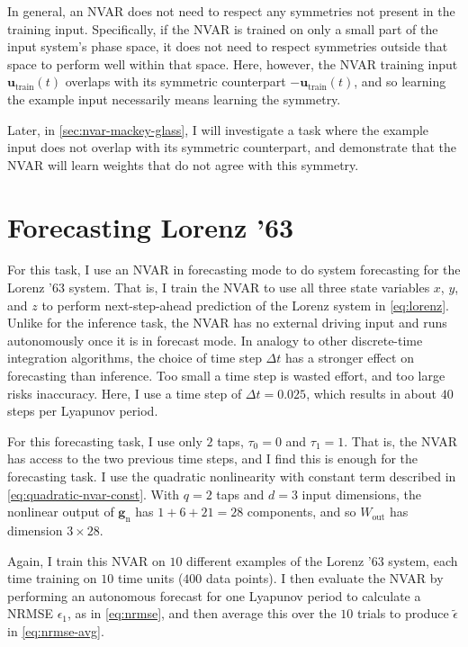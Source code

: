 In general, an NVAR does not need to respect any symmetries not
present in the training input. Specifically, if the NVAR is trained on only a small
part of the input system's phase space, it does not need to respect
symmetries outside that space to perform well within that space. Here,
however, the NVAR training input $\bm{u}_\text{train}(t)$ overlaps
with its symmetric counterpart $-\bm{u}_\text{train}(t)$, and so
learning the example input necessarily means learning the symmetry.

Later, in \cref{sec:nvar-mackey-glass}, I will investigate a task
where the example input does not overlap with its symmetric
counterpart, and demonstrate that the NVAR will learn weights that do
not agree with this symmetry.

\section{Forecasting Lorenz '63}

For this task, I use an NVAR in forecasting mode to do system
forecasting for the Lorenz '63 system. That is, I train the NVAR to
use all three state variables $x$, $y$, and $z$ to perform
next-step-ahead prediction of the Lorenz system in
\cref{eq:lorenz}. Unlike for the inference task, the NVAR has no
external driving input and runs autonomously once it is in forecast
mode. In analogy to other discrete-time integration algorithms, the
choice of time step $\Delta t$ has a stronger effect on forecasting
than inference. Too small a time step is wasted effort, and too large
risks inaccuracy. Here, I use a time step of $\Delta t = 0.025$, which
results in about $40$ steps per Lyapunov period.

For this forecasting task, I use only $2$ taps, $\tau_0 = 0$ and
$\tau_1 = 1$. That is, the NVAR has access to the two previous time
steps, and I find this is enough for the forecasting task.  I use the
quadratic nonlinearity with constant term described in
\cref{eq:quadratic-nvar-const}. With $q = 2$ taps and $d = 3$ input dimensions,
the nonlinear output of $\bm{g}_\text{n}$ has $1 + 6 + 21 = 28$
components, and so $W_\text{out}$ has dimension $3 \times 28$.

Again, I train this NVAR on $10$ different examples of the Lorenz '63
system, each time training on $10$ time units ($400$ data points). I then evaluate the
NVAR by performing an autonomous forecast for one Lyapunov period to
calculate a NRMSE $\epsilon_1$, as in \cref{eq:nrmse}, and then
average this over the $10$ trials to produce $\tilde{\epsilon}$ in
\cref{eq:nrmse-avg}.

